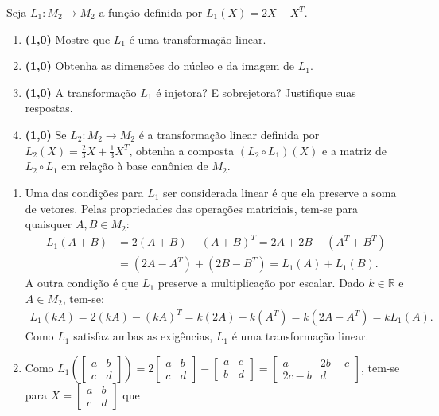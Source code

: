 \documentclass[12pt,a4paper]{article}
\newcommand*\R{\mathbb{R}}
\begin{document}
\begin{ExerciseList}

\Exercise%
Seja $L_1: M_2 \to M_2$ a função definida por $L_1(X) = 2X - X^T$.
\begin{enumerate}
\item \textbf{(1,0)} Mostre que $L_1$ é uma transformação linear.
\item \textbf{(1,0)} Obtenha as dimensões do núcleo e da imagem de $L_1$.
\item \textbf{(1,0)} A transformação $L_1$ é injetora? E sobrejetora? Justifique suas respostas.
\item \textbf{(1,0)} Se $L_2:M_2 \to M_2$ é a transformação linear definida por $L_2(X) = \frac{2}{3}X +\frac{1}{3}X^T$, obtenha a composta $(L_2 \circ L_1)(X)$ e a matriz de $L_2 \circ L_1$ em relação à base canônica de $M_2$.
\end{enumerate}
\Answer
\begin{enumerate}
\item Uma das condições para $L_1$ ser considerada linear é que ela preserve a soma de vetores. Pelas propriedades das operações matriciais, tem-se para quaisquer $A,B \in M_2$:
\begin{align*}
L_1(A+B)
& = 2(A+B) - (A+B)^T
= 2A+2B - (A^T+B^T) \\
& = (2A-A^T) + (2B - B^T)
= L_1(A) + L_1(B).
\end{align*}
A outra condição é que $L_1$ preserve a multiplicação por escalar. Dado $k \in \R$ e $A \in M_2$, tem-se:
\begin{align*}
L_1(kA)
= 2(kA) - (kA)^T
= k(2A) - k(A^T)
= k(2A - A^T)
= kL_1(A).
\end{align*}
Como $L_1$ satisfaz ambas as exigências, $L_1$ é uma transformação linear.

\item Como $L_1\left( \begin{bmatrix}
a & b \\ c & d
\end{bmatrix} \right)
=
2 \begin{bmatrix}
a & b \\ c & d
\end{bmatrix}
-
\begin{bmatrix}
a & c \\ b & d
\end{bmatrix}
=
\begin{bmatrix}
a & 2b-c \\ 2c-b & d
\end{bmatrix}$, tem-se para $X = \begin{bmatrix}
a & b \\ c & d
\end{bmatrix}$ que


\end{enumerate}
\end{ExerciseList}
\end{document}
